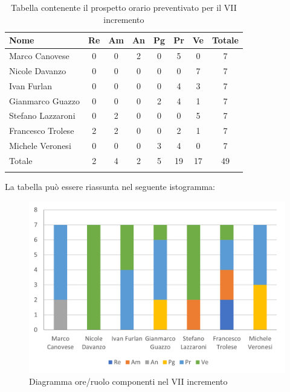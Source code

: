 \begin{longtable}{|l|c|c|c|c|c|c|c|}
	\hline
	\rowcolor{lighter-grayer}
	\textbf{Nome}     & \textbf{Re} & \textbf{Am} & \textbf{An} & \textbf{Pg} & \textbf{Pr} & \textbf{Ve} & \textbf{Totale} \\
	\hline
	\endfirsthead

	\hline
	Marco Canovese    & 0           & 0           & 2           & 0           & 5           & 0           & 7               \\
	\hline
	\hline
	Nicole Davanzo    & 0           & 0           & 0           & 0           & 0           & 7           & 7               \\
	\hline
	\hline
	Ivan Furlan       & 0           & 0           & 0           & 0           & 4           & 3           & 7               \\
	\hline
	\hline
	Gianmarco Guazzo  & 0           & 0           & 0           & 2           & 4           & 1           & 7               \\
	\hline
	\hline
	Stefano Lazzaroni & 0           & 2           & 0           & 0           & 0           & 5           & 7               \\
	\hline
	\hline
	Francesco Trolese & 2           & 2           & 0           & 0           & 2           & 1           & 7               \\
	\hline
	\hline
	Michele Veronesi  & 0           & 0           & 0           & 3           & 4           & 0           & 7               \\
	\hline
	\hline
	Totale            & 2           & 4           & 2          & 5           & 19           & 17          & 49              \\
	\hline
	\rowcolor{white}
	\caption{Tabella contenente il prospetto orario preventivato per il VII incremento}
\end{longtable}


La tabella può essere riassunta nel seguente istogramma:

\begin{figure}[H]
	\centering
	\includegraphics[width=0.8\linewidth]{res/images/preventivo/dettaglio_implementazione/4-1.png}
	\caption{Diagramma ore/ruolo componenti nel VII incremento}
	\label{fig:diagramma suddivisione ruoli VII incremento}
\end{figure}


